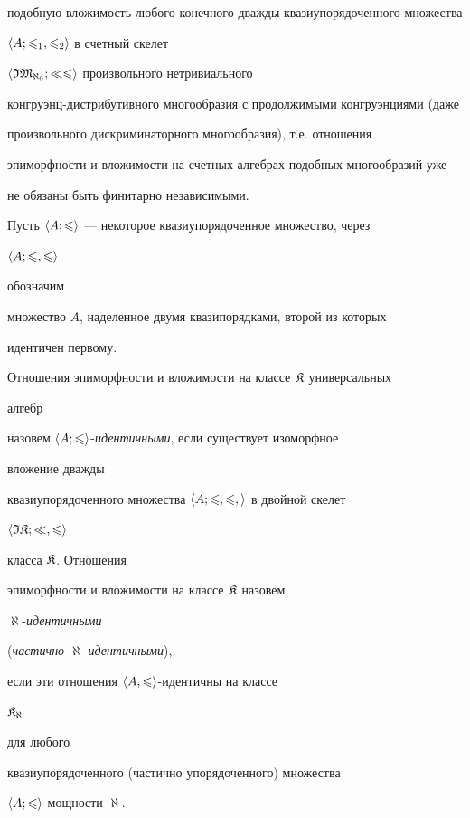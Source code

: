 подобную вложимость любого конечного дважды квазиупорядоченного множества


$\langle A;\leqslant_1,\leqslant_2\rangle$ в счетный скелет


$\langle\frak I\frak M_{\aleph_0};\ll\leqslant\rangle$ произвольного нетривиального


конгруэнц-дистрибутивного многообразия с продолжимыми конгруэнциями (даже


произвольного дискриминаторного многообразия), т.е. отношения


эпиморфности и вложимости на счетных алгебрах подобных многообразий уже


не обязаны быть финитарно независимыми.





Пусть $\langle A;\leqslant\rangle$ --- некоторое квазиупорядоченное множество, через


$\langle A;\leqslant,\leqslant\rangle$


обозначим


множество $A$, наделенное двумя квазипорядками, второй из которых


идентичен первому.





\begin{defnnonum}


Отношения эпиморфности и вложимости на классе $\frak K$ универсальных


алгебр


назовем $\langle A;\leqslant\rangle$-{\it идентичными}, если существует изоморфное


вложение дважды


квазиупорядоченного множества $\langle A;\leqslant,\leqslant,\rangle$ в двойной скелет


$\langle\frak I\frak K;\ll,\leqslant\rangle$


класса $\frak K$. Отношения


эпиморфности и вложимости на классе $\frak K$ назовем


$\aleph$-{\it идентичными}


({\it частично $\aleph$-идентичными}),


если эти отношения $\langle A,\leqslant\rangle$-идентичны на классе


$\frak K_{\aleph}$


для любого


квазиупорядоченного (частично упорядоченного) множества


$\langle A;\leqslant\rangle$ мощности $\aleph$.


\end{defnnonum}





